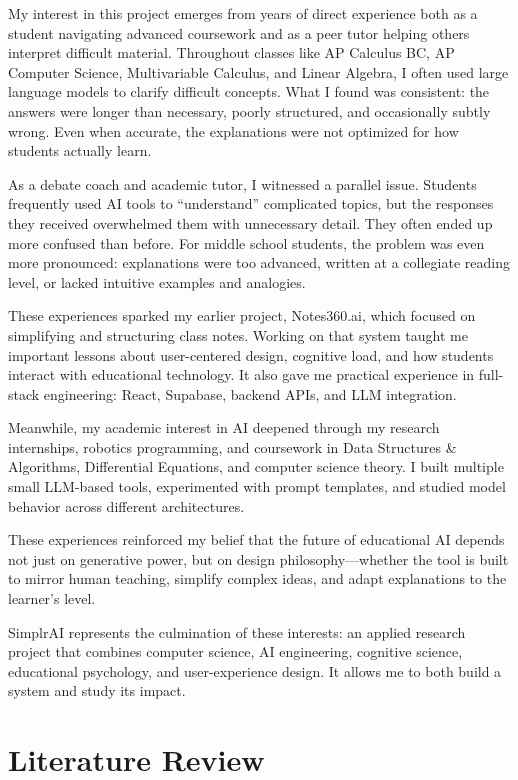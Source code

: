 \documentclass[11pt]{article}
\begin{document}
My interest in this project emerges from years of direct experience both as a
student navigating advanced coursework and as a peer tutor helping others
interpret difficult material. Throughout classes like AP Calculus BC, AP
Computer Science, Multivariable Calculus, and Linear Algebra, I often used large
language models to clarify difficult concepts. What I found was consistent: the
answers were longer than necessary, poorly structured, and occasionally subtly
wrong. Even when accurate, the explanations were not optimized for how students
actually learn.

As a debate coach and academic tutor, I witnessed a parallel issue. Students
frequently used AI tools to ``understand'' complicated topics, but the responses
they received overwhelmed them with unnecessary detail. They often ended up more
confused than before. For middle school students, the problem was even more
pronounced: explanations were too advanced, written at a collegiate reading
level, or lacked intuitive examples and analogies.

These experiences sparked my earlier project, Notes360.ai, which focused on
simplifying and structuring class notes. Working on that system taught me
important lessons about user-centered design, cognitive load, and how students
interact with educational technology. It also gave me practical experience in
full-stack engineering: React, Supabase, backend APIs, and LLM integration.

Meanwhile, my academic interest in AI deepened through my research internships,
robotics programming, and coursework in Data Structures \& Algorithms,
Differential Equations, and computer science theory. I built multiple small
LLM-based tools, experimented with prompt templates, and studied model behavior
across different architectures.

These experiences reinforced my belief that the future of educational AI depends
not just on generative power, but on design philosophy---whether the tool is
built to mirror human teaching, simplify complex ideas, and adapt explanations
to the learner's level.

SimplrAI represents the culmination of these interests: an applied research
project that combines computer science, AI engineering, cognitive science,
educational psychology, and user-experience design. It allows me to both build
a system and study its impact.

\section*{Literature Review}
\end{document}
